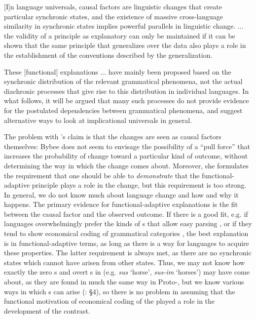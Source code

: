 \documentclass[output=paper]{langsci/langscibook}
\begin{document}
\begin{modquote}{}
[I]n language universals, causal factors are linguistic changes that create particular synchronic states, and the existence of massive cross-language similarity in synchronic states implies powerful parallels in linguistic change. ... the validity of a principle as explanatory can only be maintained if it can be shown that the same principle that generalizes over the data also plays a role in the establishment of the conventions described by the generalization. \citep[352]{Bybee1988}
\end{modquote}

\begin{modquote}
These [functional] explanations ... have mainly been proposed based on the synchronic distribution of the relevant grammatical phenomena, not the actual diachronic processes that give rise to this distribution in individual languages. In what follows, it will be argued that many such processes do not provide evidence for the postulated dependencies between grammatical phenomena, and suggest alternative ways to look at implicational universals in general. \citep[10]{Cristofaro2017}
\end{modquote}

\largerpage
The problem with ’s claim is that the changes are seen as causal factors themselves: Bybee does not seem to envisage the possibility of a “pull force” that increases the probability of change toward a particular kind of outcome, without determining the way in which the change comes about. Moreover, she formulates the requirement that one should be able to \textit{demonstrate} that the functional-adaptive principle plays a role in the change, but this requirement is too strong. In general, we do not know much about language change and how and why it happens. The primary evidence for functional-adaptive explanations is the fit between the causal factor and the observed outcome. If there is a good fit, e.g. if languages overwhelmingly prefer the kinds of s that allow easy parsing \citep{Hawkins2014_VarEff}, or if they tend to show economical coding of grammatical categories \citep{Haspelmath2008_FreqIcon}, the best explanation is in functional-adaptive terms, as long as there is a way for languages to acquire these properties. The latter requirement is always met, as there are no synchronic states which cannot have arisen from other states. Thus, we may not know how exactly the zero s and overt s in  (e.g. \textit{sus} ‘horse’, \textit{sus-im} ‘horses’) may have come about, as they are found in much the same way in Proto-, but we know various ways in which s can arise (\citealt{Cristofaro2013}: §4), so there is no problem in assuming that the functional motivation of economical coding of the  played a role in the development of the contrast.
\end{document}
